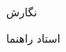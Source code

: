 \begin{center}
\vspace{2cm}

{نگارش}\\[.5em]
{\large\textbf{\ThesisAuthor}}

\vspace{1.5cm}

{استاد راهنما}\\[.5em]
{\large\textbf{\ThesisSupervisor}}

\vspace{1cm}



\vspace{2cm}

\ThesisDate

\end{center}

\newpage
